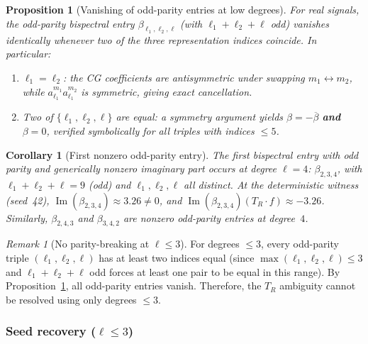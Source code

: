 \documentclass{article}
\newtheorem{proposition}[theorem]{Proposition}
\newtheorem{corollary}[theorem]{Corollary}
\theoremstyle{definition}
\theoremstyle{remark}
\newtheorem{remark}[theorem]{Remark}
\DeclareMathOperator{\im}{Im}
\newcommand{\conj}[1]{\overline{#1}}
\theoremstyle{definition}
\begin{document}
\begin{proposition}[Vanishing of odd-parity entries at low degrees]
\label{prop:app-odd-vanishing}
For real signals, the odd-parity bispectral entry
$\beta_{\ell_1,\ell_2,\ell}$ (with $\ell_1+\ell_2+\ell$ odd)
vanishes identically whenever two of the three representation indices
coincide. In particular:
\begin{enumerate}[nosep,label=(\roman*)]
\item $\ell_1 = \ell_2$: the CG coefficients are antisymmetric
  under swapping $m_1 \leftrightarrow m_2$, while
  $a_{\ell_1}^{m_1} a_{\ell_1}^{m_2}$ is symmetric, giving
  exact cancellation.
\item Two of $\{\ell_1, \ell_2, \ell\}$ are equal: a symmetry
  argument yields $\beta = -\conj\beta$ \textbf{and}
  $\beta = 0$, verified symbolically for all
  triples with indices $\le 5$.
\end{enumerate}
\end{proposition}

\begin{corollary}[First nonzero odd-parity entry]\label{cor:app-first-odd}
The first bispectral entry with odd parity and generically nonzero imaginary
part occurs at degree $\ell = 4$:
$\beta_{2,3,4}$, with
$\ell_1+\ell_2+\ell = 9$ (odd) and
$\ell_1, \ell_2, \ell$ all distinct.
At the deterministic witness (seed~42), $\im(\beta_{2,3,4}) \approx 3.26 \ne 0$,
and $\im(\beta_{2,3,4})(T_R \cdot f) \approx -3.26$.
Similarly, $\beta_{2,4,3}$ and $\beta_{3,4,2}$ are nonzero odd-parity entries
at degree~$4$.
\end{corollary}

\begin{remark}[No parity-breaking at $\ell \le 3$]\label{rem:app-no-parity-breaking-le3}
For degrees $\le 3$, every odd-parity triple $(\ell_1,\ell_2,\ell)$
has at least two indices equal (since $\max(\ell_1,\ell_2,\ell) \le 3$
and $\ell_1+\ell_2+\ell$ odd forces at least one pair to be equal in this range).
By Proposition~\ref{prop:app-odd-vanishing}, all odd-parity entries vanish.
Therefore, the $T_R$ ambiguity cannot be resolved using only degrees $\le 3$.
\end{remark}

\subsubsection{Seed recovery ($\ell \le 3$)}
\end{document}
